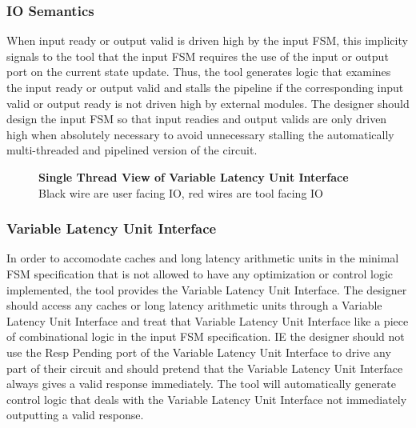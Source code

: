 \subsubsection{IO Semantics}
When input ready or output valid is driven high by the input FSM, this implicity signals to the tool that the input FSM requires the use of the input or output port on the current state update. Thus, the tool generates logic that examines the input ready or output valid and stalls the pipeline if the corresponding input valid or output ready is not driven high by external modules. The designer should design the input FSM so that input readies and output valids are only driven high when absolutely necessary to avoid unnecessary stalling the automatically multi-threaded and pipelined version of the circuit.

\begin{figure}
	\centering
    \caption{{\bf Single Thread View of Variable Latency Unit Interface} Black wire are user facing IO, red wires are tool facing IO}
	\label{fig:VarLatIO}
\end{figure}

\subsubsection{Variable Latency Unit Interface}
In order to accomodate caches and long latency arithmetic units in the minimal FSM specification that is not allowed to have any optimization or control logic implemented, the tool provides the Variable Latency Unit Interface. The designer should access any caches or long latency arithmetic units through a Variable Latency Unit Interface and treat that Variable Latency Unit Interface like a piece of combinational logic in the input FSM specification. IE the designer should not use the Resp Pending port of the Variable Latency Unit Interface to drive any part of their circuit and should pretend that the Variable Latency Unit Interface always gives a valid response immediately. The tool will automatically generate control logic that deals with the Variable Latency Unit Interface not immediately outputting a valid response.

